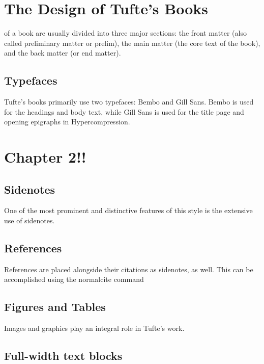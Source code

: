 \documentclass{tufte-book}
\newcommand{\thesis}{Hypercompression\xspace}
\begin{document}
\mainmatter


\chapter{The Design of Tufte's Books}
\label{ch:tufte-design}


 of a book are usually divided into three major
sections: the front matter (also called preliminary matter or prelim), the
main matter (the core text of the book), and the back matter (or end
matter).

\section{Typefaces}\label{sec:typefaces1}

Tufte's books primarily use two typefaces: Bembo and Gill Sans.  Bembo is used
for the headings and body text, while Gill Sans is used for the title page and
opening epigraphs in \thesis.

\chapter[Chapter2]{Chapter 2!!}
\label{ch:ch2}

\section{Sidenotes}\label{sec:sidenotes}
One of the most prominent and distinctive features of this style is the
extensive use of sidenotes.

\section{References}
References are placed alongside their citations as sidenotes,
as well.  This can be accomplished using the normalcite command

\section{Figures and Tables}\label{sec:figures-and-tables}
Images and graphics play an integral role in Tufte's work.

\section{Full-width text blocks}
\end{document}
